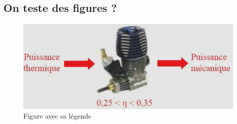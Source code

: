 \documentclass[10pt,fleqn]{article} %
\begin{document}
\subsection{On teste des figures ?}
\begin{figure}
    \centering
    \includegraphics[width=\textwidth]{templates/images/thermique.png}
    \caption{Figure avec sa légende}
    \label{fig:my_label}
\end{figure}
\end{document}

